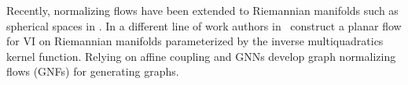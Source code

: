 Recently, normalizing flows have been extended to Riemannian manifolds such as spherical spaces in \cite{gemici2016normalizing}. In a different line of work authors in~\cite{wang-wang-2019-riemannian} construct a planar flow  \cite{rezende2015variational} for VI on Riemannian manifolds parameterized by the inverse multiquadratics kernel function. Relying on affine coupling and GNNs \cite{liu2019graph} develop graph normalizing flows (GNFs) for generating graphs.



